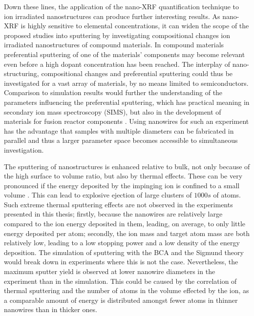 Down these lines, the application of the nano-XRF quantification technique to ion irradiated nanostructures can produce further interesting results. As nano-XRF is highly sensitive to elemental concentrations, it can widen the scope of the proposed studies into sputtering by investigating compositional changes ion irradiated nanostructures of compound materials. In compound materials preferential sputtering of one of the materials' components may become relevant even before a high dopant concentration has been reached. The interplay of nano-structuring, compositional changes and preferential sputtering could thus be investigated for a vast array of materials, by no means limited to semiconductors. Comparison to simulation results would further the understanding of the parameters influencing the preferential sputtering, which has practical meaning in secondary ion mass spectroscopy (SIMS), but also in the development of materials for fusion reactor components \cite{kelly_attempt_1978,roth_sputtering_1990,kenmotsu_effect_2011}. Using nanowires for such an experiment has the advantage that samples with multiple diameters can be fabricated in parallel and thus a larger parameter space becomes accessible to simultaneous investigation.

The sputtering of nanostructures is enhanced relative to bulk, not only because of the high surface to volume ratio, but also by thermal effects. These can be very pronounced if the energy deposited by the impinging ion is confined to a small volume \cite{greaves_enhanced_2013,ilinov_sputtering_2014,nietiadi_sputtering_2014,anders_sputtering_2015,urbassek_sputter_2015}. This can lead to explosive ejection of large clusters of $1000s$ of atoms. Such extreme thermal sputtering effects are not observed in the experiments presented in this thesis; firstly, because the nanowires are relatively large compared to the ion energy deposited in them, leading, on average, to only little energy deposited per atom; secondly, the ion mass and target atom mass are both relatively low, leading to a low stopping power and a low density of the energy deposition. The simulation of sputtering with the BCA and the Sigmund theory would break down in experiments where this is not the case. Nevertheless, the maximum sputter yield is observed at lower nanowire diameters in the experiment than in the simulation. This could be caused by the correlation of thermal sputtering and the number of atoms in the volume effected by the ion, as a comparable amount of energy is distributed amongst fewer atoms in thinner nanowires than in thicker ones.

